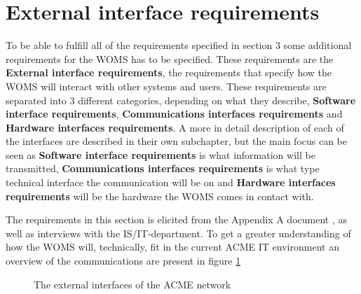\section{External interface requirements}
\label{sec:external_interface_requirements}

To be able to fulfill all of the requirements specified in section 3 some additional requirements for the WOMS has to be specified. These requirements are the \textbf{External interface requirements}, the requirements that specify how the WOMS will interact with other systems and users.  These requirements are separated into 3 different categories, depending on what they describe, \textbf{Software interface requirements}, \textbf{Communications interfaces requirements} and \textbf{Hardware interfaces requirements}. A more in detail description of each of the interfaces are described in their own subchapter, but the main focus can be seen as \textbf{Software interface requirements} is what information will be transmitted, \textbf{Communications interfaces requirements} is what type technical interface the communication will be on and \textbf{Hardware interfaces requirements} will be the hardware the WOMS comes in contact with. 

The requirements in this section is elicited from the Appendix A document \cite{A}, as well as interviews with the IS/IT-department. To get a greater understanding of how the WOMS will, technically, fit in the current ACME IT environment an overview of the communications are present in figure \ref{fig:external_interfaces}


\begin{figure}[H]
	\centering
	\setlength\fboxsep{7pt}
	\setlength\fboxrule{0.5pt}
	\caption{The external interfaces of the ACME network}
	\label{fig:external_interfaces}                      	
\end{figure}

